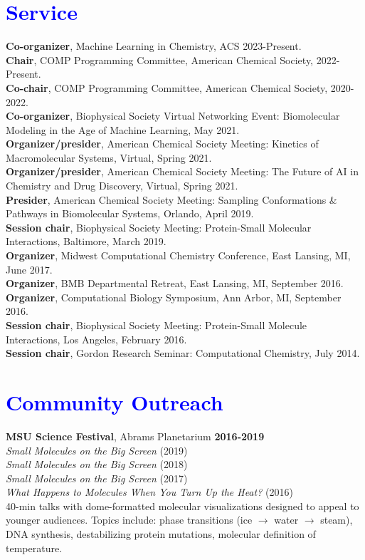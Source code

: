 \documentclass[margin,line]{res}
\begin{document}
\begin{resume}
\section{\sc \textcolor{blue}{Service}}
{\bf Co-organizer}, Machine Learning in Chemistry, ACS 2023-Present.\\ 
{\bf Chair}, COMP Programming Committee, American Chemical Society, 2022-Present.\\
{\bf Co-chair}, COMP Programming Committee, American Chemical Society, 2020-2022.\\
{\bf Co-organizer}, Biophysical Society Virtual Networking Event: Biomolecular Modeling in the Age of Machine Learning, May 2021.\\
{\bf Organizer/presider}, American Chemical Society Meeting: Kinetics of Macromolecular Systems, Virtual, Spring 2021.\\
{\bf Organizer/presider}, American Chemical Society Meeting: The Future of AI in Chemistry and Drug Discovery, Virtual, Spring 2021.\\
{\bf Presider}, American Chemical Society Meeting: Sampling Conformations \& Pathways in Biomolecular Systems, Orlando, April 2019.\\
{\bf Session chair}, Biophysical Society Meeting: Protein-Small Molecular Interactions, Baltimore, March 2019.\\
{\bf Organizer}, Midwest Computational Chemistry Conference, East Lansing, MI, June 2017. \\
{\bf Organizer}, BMB Departmental Retreat, East Lansing, MI, September 2016. \\
{\bf Organizer}, Computational Biology Symposium, Ann Arbor, MI, September 2016. \\
{\bf Session chair}, Biophysical Society Meeting: Protein-Small Molecule Interactions, Los Angeles, February 2016. \\
{\bf Session chair}, Gordon Research Seminar: Computational Chemistry, July 2014. \\

\section{\sc \textcolor{blue}{Community Outreach}}
        {\bf MSU Science Festival}, Abrams Planetarium \hfill {\bf 2016-2019} \\
        \emph{Small Molecules on the Big Screen} (2019)\\
        \emph{Small Molecules on the Big Screen} (2018)\\
        \emph{Small Molecules on the Big Screen} (2017)\\
        \emph{What Happens to Molecules When You Turn Up the Heat?} (2016)\\
        40-min talks with dome-formatted molecular visualizations designed to appeal to younger audiences.  Topics include: phase transitions (ice $\rightarrow$ water $\rightarrow$ steam), DNA synthesis, destabilizing protein mutations, molecular definition of temperature.


\end{resume}
\end{document}
